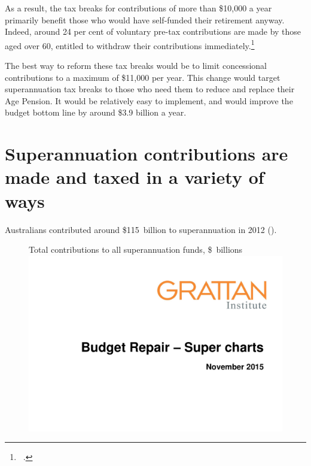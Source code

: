 As a result, the tax breaks for contributions of more than \$10,000 a year primarily benefit those who would have self-funded their retirement anyway. Indeed, around 24 per cent of voluntary pre-tax contributions are made by those aged over 60, entitled to withdraw their contributions immediately.\footnote{\gao\ \textcite{ATO2015SampleFile1213}.\DEVIATION{}} 

The best way to reform these tax breaks would be to limit concessional contributions to a maximum of \$11,000 per year. This change would target superannuation tax breaks to those who need them to reduce and replace their Age Pension. It would be relatively easy to implement, and would improve the budget bottom line by around \$3.9 billion a year.

\section{Superannuation contributions are made and taxed in a variety of ways}
Australians contributed around \$115~billion to superannuation in 2012 (). 

\begin{figure}[t]
%
{Total contributions to all superannuation funds, \$\ billions}\label{fig:SUPER-4-1}
\includegraphics[width=\columnwidth,page=19]{super-atlas/PPTX.pdf}
\end{figure}


